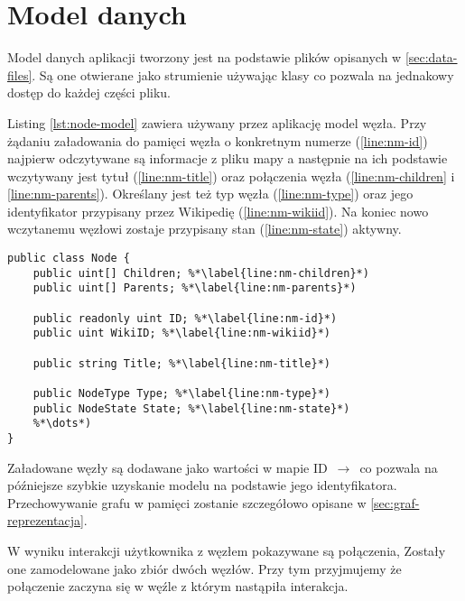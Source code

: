 \section{Model danych}

Model danych aplikacji tworzony jest na podstawie plików opisanych w \ref{sec:data-files}. Są one otwierane jako strumienie używając klasy  co pozwala na jednakowy dostęp do każdej części pliku. 

Listing \ref{lst:node-model} zawiera używany przez aplikację model węzła. Przy żądaniu załadowania do pamięci węzła o konkretnym numerze (\ref{line:nm-id}) najpierw odczytywane są informacje z pliku mapy a następnie na ich podstawie wczytywany jest tytuł (\ref{line:nm-title}) oraz połączenia węzła (\ref{line:nm-children} i \ref{line:nm-parents}). Określany jest też typ węzła (\ref{line:nm-type}) oraz jego identyfikator przypisany przez Wikipedię (\ref{line:nm-wikiid}). Na koniec nowo wczytanemu węzłowi zostaje przypisany stan (\ref{line:nm-state}) aktywny.
\begin{lstlisting}[caption={Model węzła grafu}, label=lst:node-model]
public class Node {
	public uint[] Children; %*\label{line:nm-children}*)
	public uint[] Parents; %*\label{line:nm-parents}*)

	public readonly uint ID; %*\label{line:nm-id}*)
	public uint WikiID; %*\label{line:nm-wikiid}*)

	public string Title; %*\label{line:nm-title}*)

	public NodeType Type; %*\label{line:nm-type}*)
	public NodeState State; %*\label{line:nm-state}*)
	%*\dots*)
}
\end{lstlisting}

Załadowane węzły są dodawane jako wartości w mapie ID $\,\to\,$  co pozwala na późniejsze szybkie uzyskanie modelu na podstawie jego identyfikatora. Przechowywanie grafu w pamięci zostanie szczegółowo opisane w \ref{sec:graf-reprezentacja}.

W wyniku interakcji użytkownika z węzłem pokazywane są połączenia, Zostały one zamodelowane jako zbiór dwóch węzłów. Przy tym przyjmujemy że połączenie zaczyna się w węźle z którym nastąpiła interakcja.
